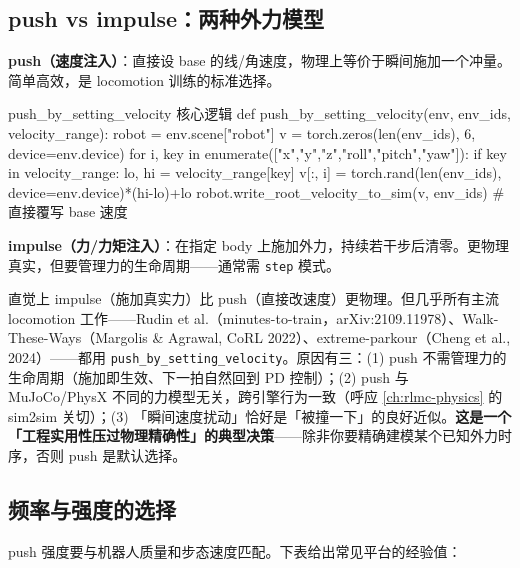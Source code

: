 \subsection{push vs impulse：两种外力模型}
\label{sec:rlmc-dr-force-two}

\textbf{push（速度注入）}：直接设 base 的线/角速度，物理上等价于瞬间施加一个冲量。简单高效，是 locomotion 训练的标准选择。

\begin{codebox}[Python]{push\_by\_setting\_velocity 核心逻辑}
def push_by_setting_velocity(env, env_ids, velocity_range):
    robot = env.scene["robot"]
    v = torch.zeros(len(env_ids), 6, device=env.device)
    for i, key in enumerate(["x","y","z","roll","pitch","yaw"]):
        if key in velocity_range:
            lo, hi = velocity_range[key]
            v[:, i] = torch.rand(len(env_ids), device=env.device)*(hi-lo)+lo
    robot.write_root_velocity_to_sim(v, env_ids)     # 直接覆写 base 速度
\end{codebox}

\textbf{impulse（力/力矩注入）}：在指定 body 上施加外力，持续若干步后清零。更物理真实，但要管理力的生命周期——通常需 \verb|step| 模式。

\begin{insight}\label{ins:rlmc-dr-push}
直觉上 impulse（施加真实力）比 push（直接改速度）更物理。但几乎所有主流 locomotion 工作——Rudin et al.（minutes-to-train，arXiv:2109.11978）\cite{rudin2021minutes}、Walk-These-Ways（Margolis \& Agrawal, CoRL 2022）\cite{margolis2022walk}、extreme-parkour（Cheng et al., 2024）\cite{cheng2024parkour}——都用 \verb|push_by_setting_velocity|。原因有三：(1) push 不需管理力的生命周期（施加即生效、下一拍自然回到 PD 控制）；(2) push 与 MuJoCo/PhysX 不同的力模型无关，跨引擎行为一致（呼应 \cref{ch:rlmc-physics} 的 sim2sim 关切）；(3) 「瞬间速度扰动」恰好是「被撞一下」的良好近似。\textbf{这是一个「工程实用性压过物理精确性」的典型决策}——除非你要精确建模某个已知外力时序，否则 push 是默认选择。
\end{insight}

\subsection{频率与强度的选择}
\label{sec:rlmc-dr-force-tune}

push 强度要与机器人质量和步态速度匹配。下表给出常见平台的经验值：


